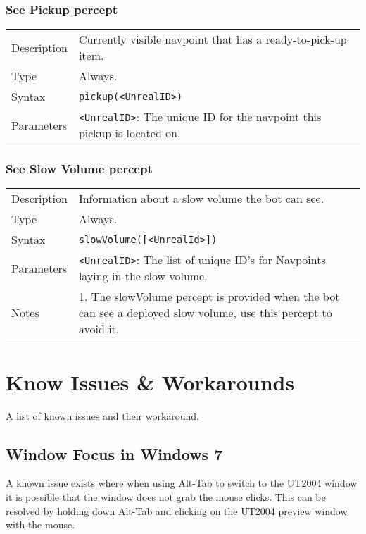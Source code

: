 \documentclass[11pt,a4paper]{article}
\begin{document}
\subsubsection*{See Pickup percept}
\begin{small}
\begin{tabular}{p{2cm}p{9cm}}
Description & Currently visible navpoint that has a ready-to-pick-up item.\\
Type & Always.\\
Syntax & \verb|pickup(<UnrealID>)|\\
Parameters & \verb|<UnrealID>|: The unique ID for the navpoint this pickup is located on.\\
\end{tabular}
\end{small}

\subsubsection*{See Slow Volume percept}
\begin{small}
\begin{tabular}{p{2cm}p{9cm}}
Description & Information about a slow volume the bot can see.\\
Type & Always.\\
Syntax & \verb|slowVolume([<UnrealId>])|\\
Parameters & \verb|<UnrealID>|: The list of unique ID's for Navpoints laying in the slow volume.\\

Notes &
	1.	The slowVolume percept is provided when the bot can see a deployed slow volume, use this percept to avoid it. \\
\end{tabular}
\end{small}


\section{Know Issues \& Workarounds}

A list of known issues and their workaround.

\subsection{Window Focus in Windows 7}

A known issue exists where when using Alt-Tab to switch to the UT2004 window it is possible that the window does not grab the mouse clicks. This can be resolved by holding down Alt-Tab and clicking on the UT2004 preview window with the mouse.
\end{document}
